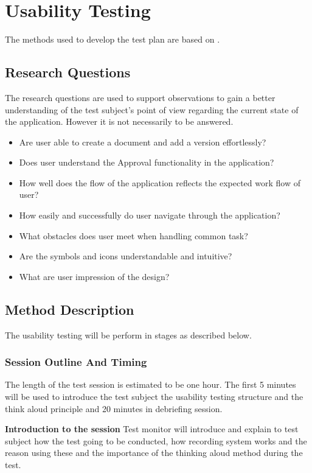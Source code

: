 \chapter{Usability Testing} \label{bilag:utestbilag}
The methods used to develop the test plan are based on \citep[p.~65-91]{HandbookofUsabilityTesting}.

\section{Research Questions}
The research questions are used to support observations to gain a better understanding of the test subject's point of view regarding the current state of the application.
However it is not necessarily to be answered.

\begin{itemize}
	\item Are user able to create a document and add a version effortlessly?
	\item Does user understand the Approval functionality in the application?
	\item How well does the flow of the application reflects the expected work flow of user?
	\item How easily and successfully do user navigate through the application?
	\item What obstacles does user meet when handling common task?
	\item Are the symbols and icons understandable and intuitive?
	\item What are user impression of the design?
\end{itemize}

\section{Method Description}
The usability testing will be perform in stages as described below.

\subsection{Session Outline And Timing}
The length of the test session is estimated to be one hour. The first 5 minutes will be used to introduce the test subject the usability testing structure and the think aloud principle and 20 minutes in debriefing session.

\textbf{Introduction to the session}
Test monitor will introduce and explain to test subject how the test going to be conducted, how recording system works and the reason using these and the importance of the thinking aloud method during the test.

